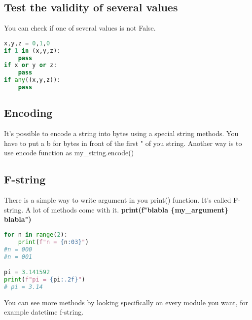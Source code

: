\documentclass[a4paper, 12pt, titlepage]{scrartcl} %
\begin{document}
\subsection{Test the validity of several values}
You can check if one of several values is not False.
\begin{lstlisting}[language=Python]
x,y,z = 0,1,0
if 1 in (x,y,z):
    pass
if x or y or z:
    pass
if any((x,y,z)):
    pass
\end{lstlisting}

\subsection{Encoding}
It's possible to encode a string into bytes using a special string methods. You have to put a b for bytes in front of the first " of you string. Another way is to use encode function as my\_string.encode()

\subsection{F-string}
\label{subsec:F-string}
There is a simple way to write argument in you print() function. It's called F-string. A lot of methods come with it. \textbf{print(f"blabla \{my\_argument\} blabla")}
\begin{lstlisting}[language=Python]
for n in range(2):
	print(f"n = {n:03}")
#n = 000
#n = 001

pi = 3.141592
print(f"pi = {pi:.2f}") 
# pi = 3.14
\end{lstlisting}

You can see more methods by looking specifically on every module you want, for example datetime f-string.
\end{document}
